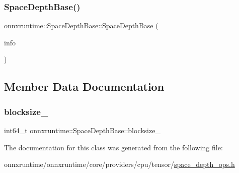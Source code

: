 \subsubsection{\texorpdfstring{Space\+Depth\+Base()}{SpaceDepthBase()}}
{\footnotesize\ttfamily onnxruntime\+::\+Space\+Depth\+Base\+::\+Space\+Depth\+Base (\begin{DoxyParamCaption}\item[{const \mbox{\hyperlink{classonnxruntime_1_1OpKernelInfo}{Op\+Kernel\+Info}} \&}]{info }\end{DoxyParamCaption})\hspace{0.3cm}{\ttfamily [inline]}}



\subsection{Member Data Documentation}
\mbox{\label{classonnxruntime_1_1SpaceDepthBase_abcda784e40ba19733f34160b9c6b185a}} 
\subsubsection{\texorpdfstring{blocksize\+\_\+}{blocksize\_}}
{\footnotesize\ttfamily int64\+\_\+t onnxruntime\+::\+Space\+Depth\+Base\+::blocksize\+\_\+\hspace{0.3cm}{\ttfamily [protected]}}



The documentation for this class was generated from the following file\+:\begin{DoxyCompactItemize}
\item 
onnxruntime/onnxruntime/core/providers/cpu/tensor/\mbox{\hyperlink{space__depth__ops_8h}{space\+\_\+depth\+\_\+ops.\+h}}\end{DoxyCompactItemize}
